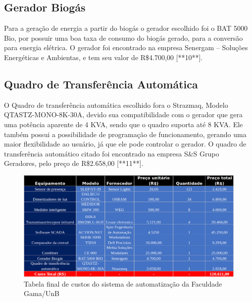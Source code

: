 \subsection{Gerador Biogás}
Para a geração de energia a partir do biogás o gerador escolhido foi o BAT 5000 Bio, por possuir uma boa taxa de consumo do biogás gerado, para a conversão para energia elétrica. O gerador foi encontrado na empresa Senergam – Soluções Energéticas e Ambientas, e tem seu valor de R\$4.700,00 [**10**].

\subsection{Quadro de Transferência Automática}
O Quadro de transferência automática escolhido fora o Strazmaq, Modelo QTASTZ-MONO-8K-30A, devido sua compatibilidade com o gerador que gera uma potência aparente de 4 KVA, sendo que o quadro suporta até 8 KVA. Ele também possui a possibilidade de programação de funcionamento, gerando uma maior flexibilidade ao usuário, já que ele pode controlar o gerador. O quadro de transferência automático citado foi encontrado na empresa S\&S Grupo Geradores, pelo preço de R\$2.658,00 [**11**].
\begin{figure}[!h]
	\centering
	\includegraphics[width=1.0\textwidth]{figuras/tabelaCustosFinal.png}
	\caption{Tabela final de custos do sistema de automatização da Faculdade Gama/UnB}
	\label{fig:tabelacustosfinais}
\end{figure}








